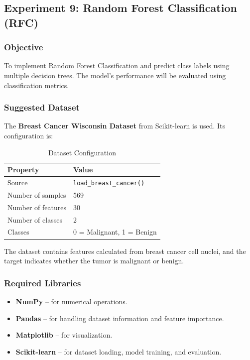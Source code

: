 \documentclass[a4paper,11pt]{article}
\begin{document}
\subsection{Experiment 9: Random Forest Classification (RFC)}

\subsubsection{Objective}
To implement Random Forest Classification and predict class labels using multiple decision trees. The model's performance will be evaluated using classification metrics.

\subsubsection{Suggested Dataset}
The \textbf{Breast Cancer Wisconsin Dataset} from Scikit-learn is used. Its configuration is:

\begin{table}[H]
\centering
\caption{Dataset Configuration}
\begin{tabular}{ll}
\toprule
\textbf{Property} & \textbf{Value} \\
\midrule
Source             & \texttt{load\_breast\_cancer()} \\
Number of samples  & 569 \\
Number of features & 30 \\
Number of classes  & 2 \\
Classes            & 0 = Malignant, 1 = Benign \\
\bottomrule
\end{tabular}
\end{table}

The dataset contains features calculated from breast cancer cell nuclei, and the target indicates whether the tumor is malignant or benign.

\subsubsection{Required Libraries}
\begin{itemize}
    \item \textbf{NumPy} -- for numerical operations.
    \item \textbf{Pandas} -- for handling dataset information and feature importance.
    \item \textbf{Matplotlib} -- for visualization.
    \item \textbf{Scikit-learn} -- for dataset loading, model training, and evaluation.
\end{itemize}
\end{document}
